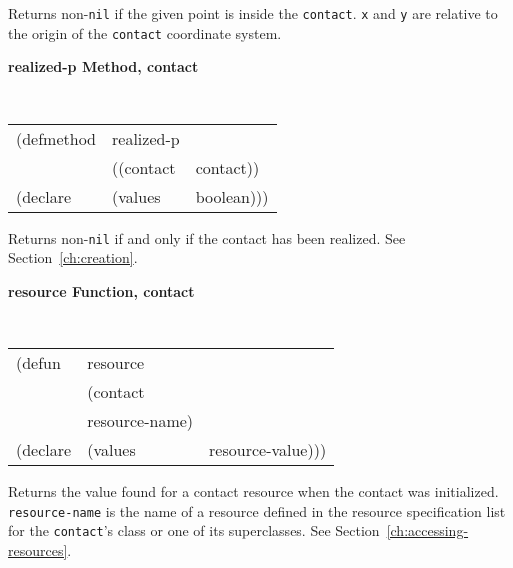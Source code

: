 \begin{flushright} \parbox[t]{6.125in}{
Returns non-{\tt nil} if the given point  is
inside the {\tt contact}. {\tt x} and {\tt y} are relative to the origin of the
{\tt contact} coordinate system.

}\end{flushright}



{\samepage
{\large {\bf realized-p \hfill Method, contact}}

\begin{flushright} \parbox[t]{6.125in}{
\tt
\begin{tabular}{lll}
\raggedright
(defmethod & realized-p & \\
& ((contact  &contact))\\
(declare &(values & boolean)))
\end{tabular}
\rm

}\end{flushright}}

\begin{flushright} \parbox[t]{6.125in}{
Returns non-{\tt nil} if and only if the contact has been realized.
See Section~\ref{ch:creation}.

}\end{flushright}


{\samepage
{\large {\bf resource \hfill Function, contact}}
\begin{flushright} \parbox[t]{6.125in}{
\tt
\begin{tabular}{lll}
\raggedright
(defun & resource & \\
& (contact\\
& resource-name) \\
(declare &(values &resource-value)))
\end{tabular}
\rm

}\end{flushright}}

\begin{flushright} \parbox[t]{6.125in}{
Returns the value found for a contact resource when the contact was initialized.
{\tt resource-name} is the name of a resource defined in the resource
specification list for the {\tt contact}'s class or one of its superclasses.
See Section~\ref{ch:accessing-resources}.

}\end{flushright}


